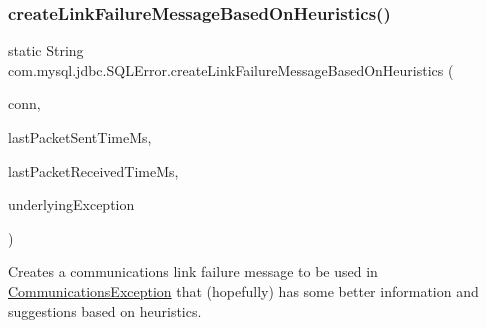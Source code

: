 \subsubsection{\texorpdfstring{create\+Link\+Failure\+Message\+Based\+On\+Heuristics()}{createLinkFailureMessageBasedOnHeuristics()}}
{\footnotesize\ttfamily static String com.\+mysql.\+jdbc.\+S\+Q\+L\+Error.\+create\+Link\+Failure\+Message\+Based\+On\+Heuristics (\begin{DoxyParamCaption}\item[{\mbox{\hyperlink{interfacecom_1_1mysql_1_1jdbc_1_1_my_s_q_l_connection}{My\+S\+Q\+L\+Connection}}}]{conn,  }\item[{long}]{last\+Packet\+Sent\+Time\+Ms,  }\item[{long}]{last\+Packet\+Received\+Time\+Ms,  }\item[{Exception}]{underlying\+Exception }\end{DoxyParamCaption})\hspace{0.3cm}{\ttfamily [static]}}

Creates a communications link failure message to be used in \mbox{\hyperlink{classcom_1_1mysql_1_1jdbc_1_1_communications_exception}{Communications\+Exception}} that (hopefully) has some better information and suggestions based on heuristics.



